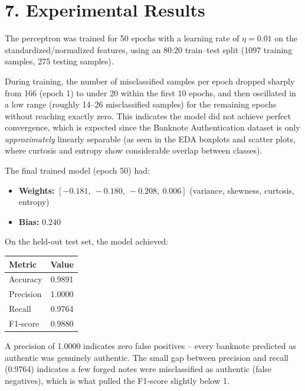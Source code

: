 \documentclass[11pt]{article}
\begin{document}

\section*{7. Experimental Results}

The perceptron was trained for 50 epochs with a learning rate of $\eta = 0.01$ on the standardized/normalized features, using an 80:20 train--test split (1097 training samples, 275 testing samples).

During training, the number of misclassified samples per epoch dropped sharply from 166 (epoch 1) to under 20 within the first 10 epochs, and then oscillated in a low range (roughly 14--26 misclassified samples) for the remaining epochs without reaching exactly zero. This indicates the model did not achieve perfect convergence, which is expected since the Banknote Authentication dataset is only \emph{approximately} linearly separable (as seen in the EDA boxplots and scatter plots, where curtosis and entropy show considerable overlap between classes).

The final trained model (epoch 50) had:

\begin{itemize}
\item \textbf{Weights:} $[-0.181,\ -0.180,\ -0.208,\ 0.006]$ (variance, skewness, curtosis, entropy)
\item \textbf{Bias:} $0.240$
\end{itemize}

On the held-out test set, the model achieved:

\begin{center}
\begin{tabular}{|l|c|}
\hline
\textbf{Metric} & \textbf{Value}\\
\hline
Accuracy & 0.9891\\
\hline
Precision & 1.0000\\
\hline
Recall & 0.9764\\
\hline
F1-score & 0.9880\\
\hline
\end{tabular}
\end{center}

A precision of 1.0000 indicates zero false positives -- every banknote predicted as authentic was genuinely authentic. The small gap between precision and recall (0.9764) indicates a few forged notes were misclassified as authentic (false negatives), which is what pulled the F1-score slightly below 1.
\end{document}
